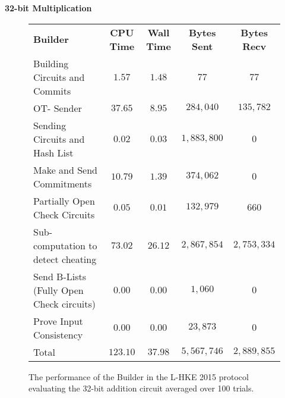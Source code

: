 \documentclass[ %
                    author={Nicholas Tutte},
                supervisor={Prof. Nigel Smart},
                    degree={MEng},
                     title={Secure Two Party Computation},
                  subtitle={A practical comparison of recent protocols},
                      type={Research - GG1K},
                      year={2015} ]{dissertation}
\begin{document}
				\FloatBarrier
				\noindent \textbf{32-bit Multiplication}
				\begin{figure}[!ht]
					\begin{tabular}{| p{4.3cm} | c c c c |}
						\hline
						\textbf{Builder} & \textbf{CPU Time} & \textbf{Wall Time} & \textbf{Bytes Sent} & \textbf{Bytes Recv} \\
						\thickhline
						Building Circuits and Commits & $1.57$ & $1.48$ & $77$ & $77$ \\
						\hline
						OT- Sender & $37.65$ & $8.95$ & $284,040$ & $135,782$ \\
						\hline
						Sending Circuits and Hash List & $0.02$ & $0.03$ & $1,883,800$ & $0$ \\
						\hline
						Make and Send Commitments & $10.79$ & $1.39$ & $374,062$ & $0$ \\
						\hline
						Partially Open Check Circuits & $0.05$ & $0.01$ & $132,979$ & $660$ \\
						\hline
						Sub-computation to detect cheating & $73.02$ & $26.12$ & $2,867,854$ & $2,753,334$ \\
						\hline
						Send B-Lists (Fully Open Check circuits) & $0.00$ & $0.00$ & $1,060$ & $0$ \\
						\hline
						Prove Input Consistency & $0.00$ & $0.00$ & $23,873$ & $0$ \\
						\thickhline
						Total & $123.10$ & $37.98$ & $5,567,746$ & $2,889,855$ \\
						\hline
					\end{tabular}
					\caption{The performance of the Builder in the L-HKE 2015 protocol evaluating the 32-bit addition circuit averaged over 100 trials. \label{table:L-HKE_2015_Mul_Builder}}
				\end{figure}
\end{document}
